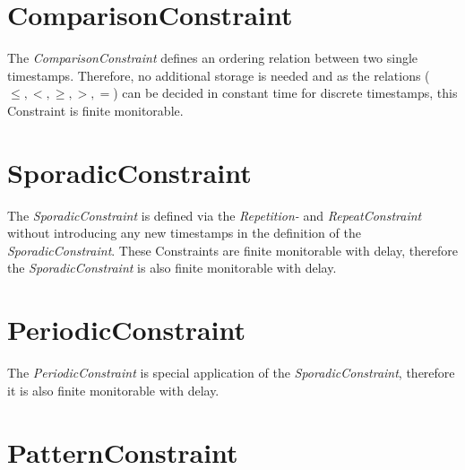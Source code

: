 \section{ComparisonConstraint}
	The \emph{ComparisonConstraint} defines an ordering relation between two single timestamps. Therefore, no additional storage is needed and as the relations ($\leq, <, \geq, >, =$) can be decided in constant time for discrete timestamps, this Constraint is finite monitorable.
	
\section{SporadicConstraint}
	The \emph{SporadicConstraint} is defined via the \emph{Repetition-} and \emph{RepeatConstraint} without introducing any new timestamps in the definition of the \emph{SporadicConstraint}. These Constraints are finite monitorable with delay, therefore the \emph{SporadicConstraint} is also finite monitorable with delay.
	
\section{PeriodicConstraint}
	The \emph{PeriodicConstraint} is special application of the \emph{SporadicConstraint}, therefore it is also finite monitorable with delay.
	
\section{PatternConstraint}
%
%	
	
